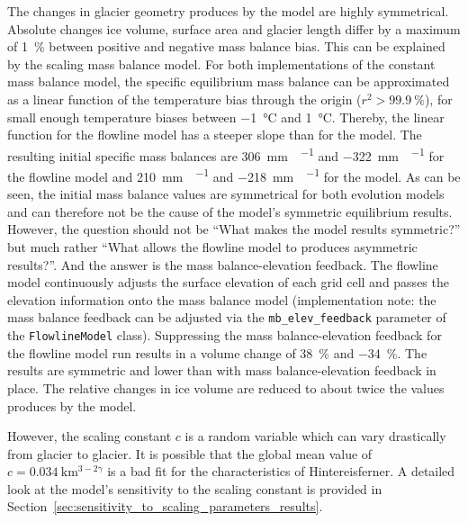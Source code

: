     The changes in glacier geometry produces by the \vas{} model are highly symmetrical. Absolute changes ice volume, surface area and glacier length differ by a maximum of \SI{1}{\percent} between positive and negative mass balance bias. This can be explained by the scaling mass balance model. For both implementations of the constant mass balance model, the specific equilibrium mass balance can be approximated as a linear function of the temperature bias through the origin ($r^2 > \SI{99.9}{\percent}$), for small enough temperature biases between \SI{-1}{\celsius} and \SI{+1}{\celsius}. Thereby, the linear function for the flowline model has a steeper slope than for the \vas{} model. The resulting initial specific mass balances are \SI{+306}{\milli\meter\waterequivalent\per\year} and \SI{-322}{\milli\meter\waterequivalent\per\year} for the flowline model and \SI{+210}{\milli\meter\waterequivalent\per\year} and \SI{-218}{\milli\meter\waterequivalent\per\year} for the \vas{} model. As can be seen, the initial mass balance values are symmetrical for both evolution models and can therefore not be the cause of the \vas{} model's symmetric equilibrium results.
    However, the question should not be “What makes the \vas{} model results symmetric?” but much rather “What allows the flowline model to produces asymmetric results?”. And the answer is the mass balance-elevation feedback. The flowline model continuously adjusts the surface elevation of each grid cell and passes the elevation information onto the mass balance model (implementation note: the mass balance feedback can be adjusted via the \lstinline`mb_elev_feedback` parameter of the \lstinline`FlowlineModel` class). Suppressing the mass balance-elevation feedback for the flowline model run results in a volume change of \SI{+38}{\percent} and \SI{-34}{\percent}. The results are symmetric and lower than with mass balance-elevation feedback in place. The relative changes in ice volume are reduced to about twice the values produces by the \vas{} model.
    
    However, the scaling constant $c$ is a random variable which can vary drastically from glacier to glacier. It is possible that the global mean value of $c=\SI{0.034}{\kilo\meter^{3-2\gamma}}$ is a bad fit for the characteristics of Hintereisferner. A detailed look at the model's sensitivity to the scaling constant is provided in Section~\ref{sec:sensitivity_to_scaling_parameters_results}.



